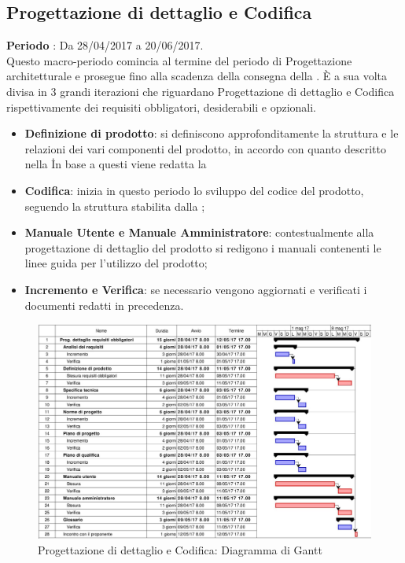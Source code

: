 \documentclass[../PianoDiProgetto.tex]{subfiles}
\begin{document}
		
		
		\subsection{Progettazione di dettaglio e Codifica}
		\textbf{Periodo} : Da 28/04/2017 a 20/06/2017. \\
		Questo macro-periodo comincia al termine del periodo di Progettazione architetturale e prosegue fino alla scadenza della consegna della \revisionediqualifica.
		È a sua volta divisa in 3 grandi iterazioni che riguardano Progettazione di dettaglio e Codifica rispettivamente dei requisiti obbligatori, desiderabili e opzionali.
		\begin{itemize}
			\item \textbf{Definizione di prodotto}: si definiscono approfonditamente la struttura e le relazioni dei vari componenti del prodotto, in accordo con quanto descritto nella \specificatecnica\. In base a questi viene redatta la \;
			\item \textbf{Codifica}: inizia in questo periodo lo sviluppo del codice del prodotto, seguendo la struttura stabilita dalla  ;
			\item \textbf{Manuale Utente e Manuale Amministratore}: contestualmente alla progettazione di dettaglio del prodotto si redigono i manuali contenenti le linee guida per l'utilizzo del prodotto; 
			\item \textbf{Incremento e Verifica}: se necessario vengono aggiornati e verificati i documenti redatti in precedenza.
		\end{itemize}
		\begin{figure}[H]
			\centering
			\includegraphics[scale=0.55]{Figures/Gantt_DettaglioObbligatori}
			\caption{Progettazione di dettaglio e Codifica: Diagramma di Gantt}
		\end{figure}
\end{document}
